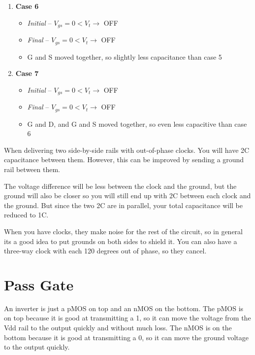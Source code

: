 \documentclass{article}
\begin{document}
\begin{enumerate}
\item \textbf{Case 6} \begin{itemize}
\item \textit{Initial} -- $V_{gs} = 0 < V_t \rightarrow$ OFF
\item \textit{Final} -- $V_{gs} = 0 < V_t \rightarrow$ OFF 
\item G and S moved together, so slightly less capacitance than case 5
\end{itemize}


\item \textbf{Case 7} \begin{itemize}
\item \textit{Initial} -- $V_{gs} = 0 < V_t \rightarrow$ OFF
\item \textit{Final} -- $V_{gs} = 0 < V_t \rightarrow$ OFF 
\item G and D, and G and S moved together, so even less capacitive than case 6
\end{itemize}

\end{enumerate}

\newpage
\normalsize

When delivering two side-by-side rails with out-of-phase clocks. You will have 2C capacitance between them. However, this can be improved by sending a ground rail between them. 

The voltage difference will be less between the clock and the ground, but the ground will also be closer so you will still end up with 2C between each clock and the ground. But since the two 2C are in parallel, your total capacitance will be reduced to 1C. 

When you have clocks, they make noise for the rest of the circuit, so in general its a good idea to put grounds on both sides to shield it. You can also have a three-way clock with each 120 degrees out of phase, so they cancel.

\section{Pass Gate}

An inverter is just a pMOS on top and an nMOS on the bottom. The pMOS is on top because it is good at transmitting a 1, so it can move the voltage from the Vdd rail to the output quickly and without much loss. The nMOS is on the bottom because it is good at transmitting a 0, so it can move the ground voltage to the output quickly.
\end{document}
